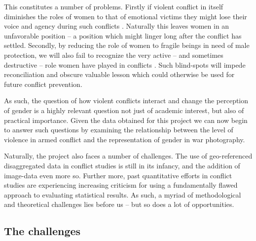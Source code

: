 \documentclass[a4paper]{article}
\begin{document}
This constitutes a number of problems. Firstly if violent conflict in itself diminishes the roles of women to that of emotional victims they might lose their voice and agency during such conflicts \citep{hansen2000gender, hansen2000little}. Naturally this leaves women in an unfavorable position \citep[294-297]{hansen2000little} -- a position which might linger long after the conflict has settled. Secondly, by reducing the role of women to fragile beings in need of male protection, we will also fail to recognize the very active -- and sometimes destructive -- role women have played in conflicts \citep[66]{hansen2000gender}. Such blind-spots will impede reconciliation and obscure valuable lesson which could otherwise be used for future conflict prevention.\par

As such, the question of how violent conflicts interact and change the perception of gender is a highly relevant question not just of academic interest, but also of practical importance. Given the data obtained for this project we can now begin to answer such questions by examining the relationship between the level of violence in armed conflict and the representation of gender in war photography.\par



Naturally, the project also faces a number of challenges. The use of geo-referenced disaggregated data in conflict studies is still in its infancy, and the addition of image-data even more so. Further more, past quantitative efforts in conflict studies are experiencing increasing criticism for using a fundamentally flawed approach to evaluating statistical results. As such, a myriad of methodological and theoretical challenges lies before us -- but so does a lot of opportunities.\par


\subsection{The challenges}
\end{document}
